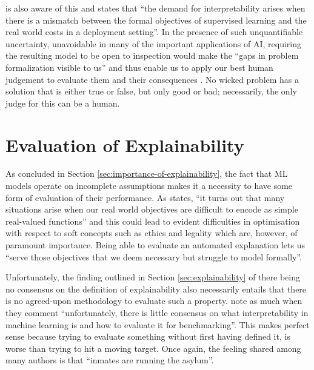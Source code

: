 \citet{Lipton2016} is also aware of this and states that \enquote{the demand for interpretability arises when there is a mismatch between the formal objectives of supervised learning and the real world costs in a deployment setting}.
In the presence of such unquantifiable uncertainty, unavoidable in many of the important applications of AI, requiring the resulting model to be open to inspection would make the \enquote{gaps in problem formalization visible to us} and thus enable us to apply our best human judgement to evaluate them and their consequences \citep{doshi2017towards}.
No wicked problem has a solution that is either true or false, but only good or bad; necessarily, the only judge for this can be a human.

\section{Evaluation of Explainability} \label{sec:evaluation-of-explainability}
As concluded in Section \ref{sec:importance-of-explainability}, the fact that ML models operate on incomplete assumptions makes it a necessity to have some form of evaluation of their performance.
As \citet{Lipton2016} states, \enquote{it turns out that many situations arise when our real world objectives are difficult to encode as simple real-valued functions} and this could lead to evident difficulties in optimisation with respect to soft concepts such as ethics and legality which are, however, of paramount importance.
Being able to evaluate an automated explanation lets us \enquote{serve those objectives that we deem necessary but struggle to model formally}.

Unfortunately, the finding outlined in Section \ref{sec:explainability} of there being no consensus on the definition of explainability also necessarily entails that there is no agreed-upon methodology to evaluate such a property.
\citet{doshi2017towards} note as much when they comment \enquote{unfortunately, there is little consensus on what interpretability in machine learning is and how to evaluate it for benchmarking}.
This makes perfect sense because trying to evaluate something without first having defined it, is worse than trying to hit a moving target.
Once again, the feeling shared among many authors is that \enquote{inmates are running the asylum}.

